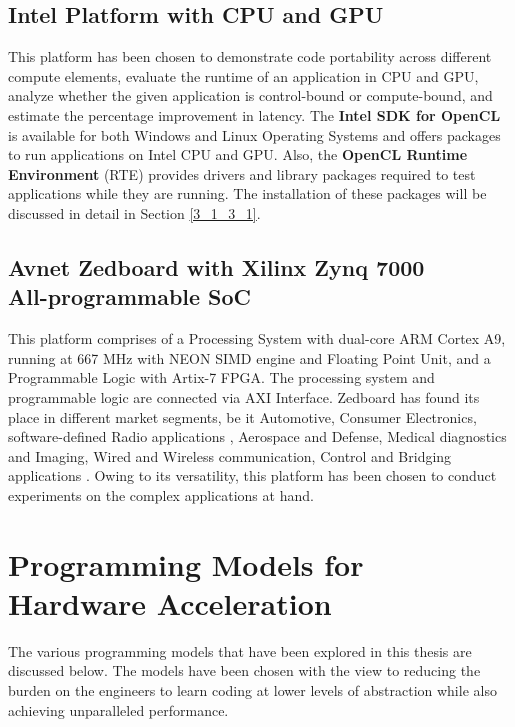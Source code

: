 \subsection{Intel Platform with CPU and GPU}
This platform has been chosen to demonstrate code portability across different compute elements, evaluate the runtime of an application in CPU and GPU, analyze whether the given application is control-bound or compute-bound, and estimate the percentage improvement in latency. The \textbf{Intel SDK for OpenCL}\cite{intel_openclSDK} is available for both Windows and Linux Operating Systems and offers packages to run applications on Intel CPU and GPU. Also, the \textbf{OpenCL Runtime Environment} (RTE) \cite{intel_runtime} provides drivers and library packages required to test applications while they are running. The installation of these packages will be discussed in detail in Section \ref{3_1_3_1}.   
\subsection{Avnet Zedboard with Xilinx Zynq 7000\\All-programmable SoC}
This platform comprises of a Processing System with dual-core ARM Cortex A9, running at 667 MHz with NEON SIMD engine and Floating Point Unit, and a Programmable Logic with Artix-7 FPGA. The processing system and programmable logic are connected via AXI Interface. Zedboard has found its place in different market segments, be it Automotive, Consumer Electronics, software-defined Radio applications \cite{dobson2014architecture}, Aerospace and Defense, Medical diagnostics and Imaging, Wired and Wireless communication, Control and Bridging applications \cite{xil_zynqbrief}. Owing to its versatility, this platform has been chosen to conduct experiments on the complex applications at hand.
\section{Programming Models for Hardware Acceleration}
\label{2_3}
The various programming models that have been explored in this thesis are discussed below. The models have been chosen with the view to reducing the burden on the engineers to learn coding at lower levels of abstraction while also achieving unparalleled performance.

